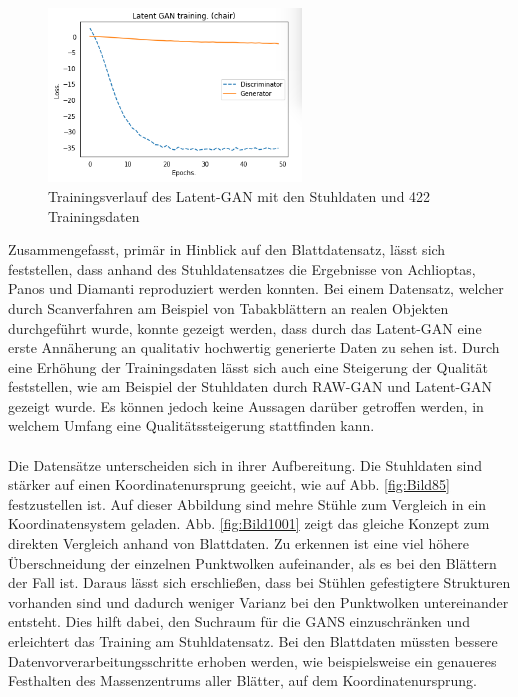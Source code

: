 \documentclass{llncs}
\begin{document}
\begin{figure}[htbp] 
	\centering
	\includegraphics[width=0.6\textwidth]{raw_gan_latent_gan_chair_result_400_example.png}
	\caption{Trainingsverlauf des Latent-GAN mit den Stuhldaten und 422 Trainingsdaten}
	\label{fig:Bild65}
\end{figure}
\pagebreak\linebreak
Zusammengefasst, primär in Hinblick auf den Blattdatensatz, lässt sich feststellen, dass anhand des Stuhldatensatzes die Ergebnisse von Achlioptas, Panos und Diamanti \cite{3dgan} reproduziert werden konnten. Bei einem Datensatz, welcher durch Scanverfahren am Beispiel von Tabakblättern an realen Objekten durchgeführt wurde, konnte gezeigt werden, dass durch das Latent-GAN eine erste Annäherung an qualitativ hochwertig generierte Daten zu sehen ist. Durch eine Erhöhung der Trainingsdaten lässt sich auch eine Steigerung der Qualität feststellen, wie am Beispiel der Stuhldaten durch RAW-GAN und Latent-GAN gezeigt wurde. Es können jedoch keine Aussagen darüber getroffen werden, in welchem Umfang eine Qualitätssteigerung stattfinden kann. 
\\\\
Die Datensätze unterscheiden sich in ihrer Aufbereitung. Die Stuhldaten sind stärker auf einen Koordinatenursprung geeicht, wie auf Abb. \ref{fig:Bild85} festzustellen ist. Auf dieser Abbildung sind mehre Stühle zum Vergleich in ein Koordinatensystem geladen. Abb. \ref{fig:Bild1001} zeigt das gleiche Konzept zum direkten Vergleich anhand von Blattdaten. Zu erkennen ist eine viel höhere Überschneidung der einzelnen Punktwolken aufeinander, als es bei den Blättern der Fall ist. Daraus lässt sich erschließen, dass bei Stühlen gefestigtere Strukturen vorhanden sind und dadurch weniger Varianz bei den Punktwolken untereinander entsteht. Dies hilft dabei, den Suchraum für die GANS einzuschränken und erleichtert das Training am Stuhldatensatz. Bei den Blattdaten müssten bessere Datenvorverarbeitungsschritte erhoben werden, wie beispielsweise ein genaueres Festhalten des Massenzentrums aller Blätter, auf dem Koordinatenursprung.
\end{document}
